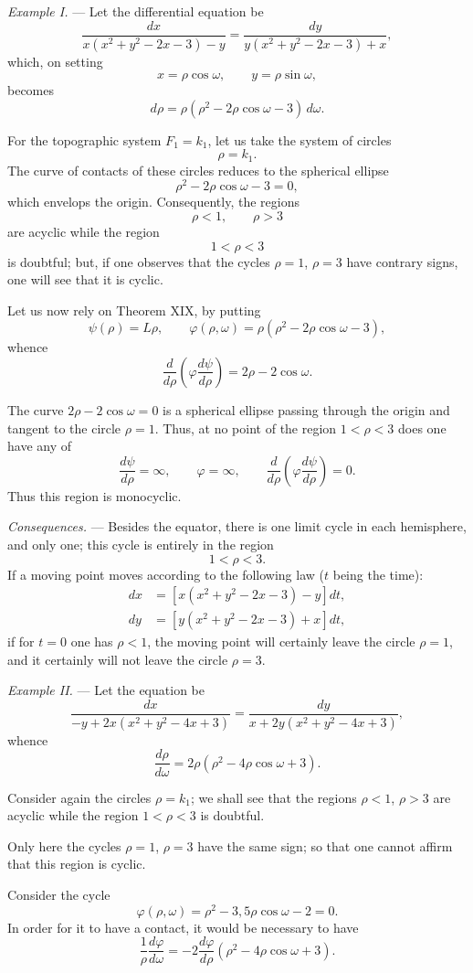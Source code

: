\documentclass[11pt]{article}
\begin{document}
\emph{Example I.} --- Let the differential equation be
\[
\frac{dx}{x(x^2+y^2-2x-3)-y}
=
\frac{dy}{y(x^2+y^2-2x-3)+x},
\]
which, on setting
\[
x=\rho\cos\omega,
\qquad
 y=\rho\sin\omega,
\]
becomes
\[
d\rho=\rho(\rho^2-2\rho\cos\omega-3)\,d\omega.
\]

For the topographic system $F_1=k_1$, let us take the system of circles
\[
\rho=k_1.
\]
The curve of contacts of these circles reduces to the spherical ellipse
\[
\rho^2-2\rho\cos\omega-3=0,
\]
which envelops the origin. Consequently, the regions
\[
\rho<1,
\qquad
\rho>3
\]
are acyclic while the region
\[
1<\rho<3
\]
is doubtful; but, if one observes that the cycles $\rho=1$, $\rho=3$ have contrary signs, one will see that it is cyclic.

Let us now rely on Theorem XIX, by putting
\[
\psi(\rho)=L\rho,
\qquad
\varphi(\rho,\omega)=\rho(\rho^2-2\rho\cos\omega-3),
\]
whence
\[
\frac{d}{d\rho}\left(\varphi\frac{d\psi}{d\rho}\right)=2\rho-2\cos\omega.
\]

The curve $2\rho-2\cos\omega=0$ is a spherical ellipse passing through the origin and tangent to the circle $\rho=1$. Thus, at no point of the region $1<\rho<3$ does one have any of
\[
\frac{d\psi}{d\rho}=\infty,
\qquad
\varphi=\infty,
\qquad
\frac{d}{d\rho}\left(\varphi\frac{d\psi}{d\rho}\right)=0.
\]
Thus this region is monocyclic.

\emph{Consequences.} --- Besides the equator, there is one limit cycle in each hemisphere, and only one; this cycle is entirely in the region
\[
1<\rho<3.
\]
If a moving point moves according to the following law ($t$ being the time):
\[
\begin{aligned}
dx&=[x(x^2+y^2-2x-3)-y]dt,\\
dy&=[y(x^2+y^2-2x-3)+x]dt,
\end{aligned}
\]
if for $t=0$ one has $\rho<1$, the moving point will certainly leave the circle $\rho=1$, and it certainly will not leave the circle $\rho=3$.

\emph{Example II.} --- Let the equation be
\[
\frac{dx}{-y+2x(x^2+y^2-4x+3)}
=
\frac{dy}{x+2y(x^2+y^2-4x+3)},
\]
whence
\[
\frac{d\rho}{d\omega}=2\rho(\rho^2-4\rho\cos\omega+3).
\]

Consider again the circles $\rho=k_1$; we shall see that the regions $\rho<1$, $\rho>3$ are acyclic while the region $1<\rho<3$ is doubtful.

Only here the cycles $\rho=1$, $\rho=3$ have the same sign; so that one cannot affirm that this region is cyclic.

Consider the cycle
\[
\varphi(\rho,\omega)=\rho^2-3{,}5\rho\cos\omega-2=0.
\]
In order for it to have a contact, it would be necessary to have
\begin{equation*}
\tag{$\lambda$}
\frac1\rho\frac{d\varphi}{d\omega}=-2\frac{d\varphi}{d\rho}(\rho^2-4\rho\cos\omega+3).
\end{equation*}
\end{document}
